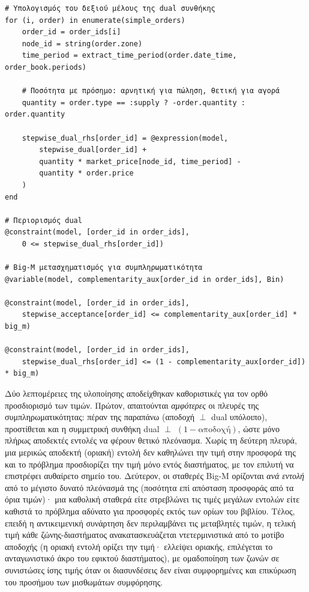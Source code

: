 \begin{samepage}
\begin{verbatim}
# Υπολογισμός του δεξιού μέλους της dual συνθήκης
for (i, order) in enumerate(simple_orders)
    order_id = order_ids[i]
    node_id = string(order.zone)
    time_period = extract_time_period(order.date_time, order_book.periods)
    
    # Ποσότητα με πρόσημο: αρνητική για πώληση, θετική για αγορά
    quantity = order.type == :supply ? -order.quantity : order.quantity
    
    stepwise_dual_rhs[order_id] = @expression(model,
        stepwise_dual[order_id] +
        quantity * market_price[node_id, time_period] -
        quantity * order.price
    )
end

# Περιορισμός dual
@constraint(model, [order_id in order_ids],
    0 <= stepwise_dual_rhs[order_id])

# Big-M μετασχηματισμός για συμπληρωματικότητα
@variable(model, complementarity_aux[order_id in order_ids], Bin)

@constraint(model, [order_id in order_ids],
    stepwise_acceptance[order_id] <= complementarity_aux[order_id] * big_m)

@constraint(model, [order_id in order_ids],
    stepwise_dual_rhs[order_id] <= (1 - complementarity_aux[order_id]) * big_m)
\end{verbatim}
\end{samepage}

Δύο λεπτομέρειες της υλοποίησης αποδείχθηκαν καθοριστικές για τον ορθό προσδιορισμό των τιμών. Πρώτον, απαιτούνται \emph{αμφότερες} οι πλευρές της συμπληρωματικότητας: πέραν της παραπάνω (αποδοχή $\perp$ dual υπόλοιπο), προστίθεται και η συμμετρική συνθήκη dual $\perp$ $(1 - \text{αποδοχή})$, ώστε μόνο πλήρως αποδεκτές εντολές να φέρουν θετικό πλεόνασμα. Χωρίς τη δεύτερη πλευρά, μια μερικώς αποδεκτή (οριακή) εντολή δεν καθηλώνει την τιμή στην προσφορά της και το πρόβλημα προσδιορίζει την τιμή μόνο εντός διαστήματος, με τον επιλυτή να επιστρέφει αυθαίρετο σημείο του. Δεύτερον, οι σταθερές Big-M ορίζονται \emph{ανά εντολή} από το μέγιστο δυνατό πλεόνασμά της (ποσότητα επί απόσταση προσφοράς από τα όρια τιμών)· μια καθολική σταθερά είτε στρεβλώνει τις τιμές μεγάλων εντολών είτε καθιστά το πρόβλημα αδύνατο για προσφορές εκτός των ορίων του βιβλίου. Τέλος, επειδή η αντικειμενική συνάρτηση δεν περιλαμβάνει τις μεταβλητές τιμών, η τελική τιμή κάθε ζώνης-διαστήματος ανακατασκευάζεται ντετερμινιστικά από το μοτίβο αποδοχής (η οριακή εντολή ορίζει την τιμή· ελλείψει οριακής, επιλέγεται το ανταγωνιστικό άκρο του εφικτού διαστήματος), με ομαδοποίηση των ζωνών σε συνιστώσες ίσης τιμής όταν οι διασυνδέσεις δεν είναι συμφορημένες και επικύρωση του προσήμου των μισθωμάτων συμφόρησης.

